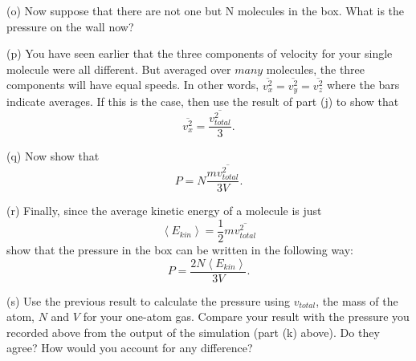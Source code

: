 (o) Now suppose that there are not one but N molecules in the box. What
is the pressure on the wall now?
\answerspace{20mm}

(p) You have seen earlier that the three components of velocity for your single molecule were all different.  But averaged over $many$ molecules, the three components will have equal speeds.  In other words,  $\overline{v_{x}^{2}}=\overline{v_{y}^{2}}=\overline{v_{z}^{2}}$ where the bars indicate averages. If this is the case, then use the result of part (j) to show that
\[
\overline{v_{x}^{2}}=\frac{\overline{v_{total}^{2}}}{3}.\]


(q) Now show that 
\[
P=N\frac{m\overline{v_{total}^{2}}}{3V}.\]

\answerspace{20mm}

(r) Finally, since the average kinetic energy of a molecule is just
\[
\left<E_{kin}\right>=\frac{1}{2}m\overline{v_{total}^{2}}\]
show that the pressure in the box can be written in the following
way:
\[
P=\frac{2N\left<E_{kin}\right>}{3V}.\]
\answerspace{20mm}

(s) Use the previous result to calculate the pressure using $v_{total}$, the mass of the atom, $N$ and $V$ for your one-atom gas. Compare your result with the pressure you recorded above from the output of the simulation (part (k) above).
Do they agree? How would you account for any difference?
\answerspace{20mm}
